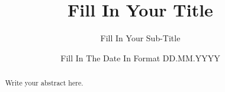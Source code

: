 \documentclass[is]{mscthesis}
\title{Fill In Your Title}
\subtitle{Fill In Your Sub-Title}
\date{Fill In The Date In Format DD.MM.YYYY}
\affiliation{
  \institution{\thesisinstitution}
  \city{\thesiscity}
  \country{\thesiscountry}
}
\begin{document}
\pagestyle{plain}
\setcounter{page}{0}

\maketitlepage
\fixemptypage

\begin{abstract}
Write your abstract here.
\end{abstract}

\maketitle













\newpage

\end{document}
